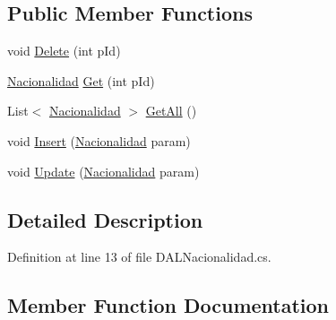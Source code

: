 \subsection*{Public Member Functions}
\begin{DoxyCompactItemize}
\item 
void \hyperlink{classprj_progra_i_i_i_1_1_layer_1_1_d_a_l_1_1_d_a_l_nacionalidad_a4ff0c7613c26c969e5f515bbebad5652}{Delete} (int p\+Id)
\item 
\hyperlink{classprj_progra_i_i_i_1_1_layer_1_1_entities_1_1_nacionalidad}{Nacionalidad} \hyperlink{classprj_progra_i_i_i_1_1_layer_1_1_d_a_l_1_1_d_a_l_nacionalidad_aaae73fec1bc1e05c37358116139ce47a}{Get} (int p\+Id)
\item 
List$<$ \hyperlink{classprj_progra_i_i_i_1_1_layer_1_1_entities_1_1_nacionalidad}{Nacionalidad} $>$ \hyperlink{classprj_progra_i_i_i_1_1_layer_1_1_d_a_l_1_1_d_a_l_nacionalidad_a7a851ef044363eb2a9be47aaa154b40b}{Get\+All} ()
\item 
void \hyperlink{classprj_progra_i_i_i_1_1_layer_1_1_d_a_l_1_1_d_a_l_nacionalidad_a9db21efb8376e322b250d5b2a6aaacbd}{Insert} (\hyperlink{classprj_progra_i_i_i_1_1_layer_1_1_entities_1_1_nacionalidad}{Nacionalidad} param)
\item 
void \hyperlink{classprj_progra_i_i_i_1_1_layer_1_1_d_a_l_1_1_d_a_l_nacionalidad_a3aef21dd2b5393e3d17501bdc60d589b}{Update} (\hyperlink{classprj_progra_i_i_i_1_1_layer_1_1_entities_1_1_nacionalidad}{Nacionalidad} param)
\end{DoxyCompactItemize}


\subsection{Detailed Description}


Definition at line 13 of file D\+A\+L\+Nacionalidad.\+cs.



\subsection{Member Function Documentation}
\hypertarget{classprj_progra_i_i_i_1_1_layer_1_1_d_a_l_1_1_d_a_l_nacionalidad_a4ff0c7613c26c969e5f515bbebad5652}{}\label{classprj_progra_i_i_i_1_1_layer_1_1_d_a_l_1_1_d_a_l_nacionalidad_a4ff0c7613c26c969e5f515bbebad5652} 
